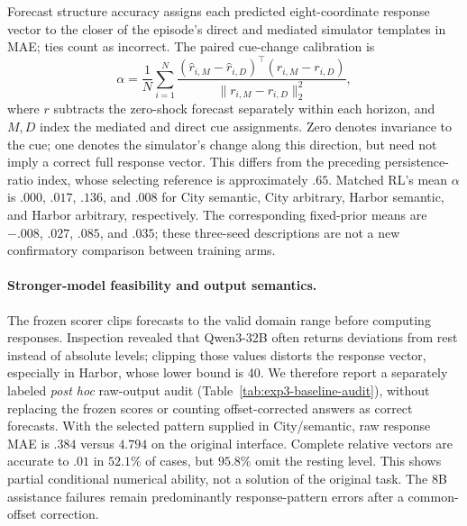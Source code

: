 \begin{table}[htbp]
\centering\small

\caption{\textbf{Reference naming succeeds while forecasting remains difficult.}
Name is selection-only accuracy; Original, Both, and Selected are response MAE
for the three forecast interfaces. Trained rows average all three seeds, not
selected endpoints. Each checkpoint contributes 24 paired episodes per cell.
Domain scales differ, so compare interfaces within a domain.}
\label{tab:exp3-components}
\end{table}

Forecast structure accuracy assigns each predicted eight-coordinate response
vector to the closer of the episode's direct and mediated simulator templates
in MAE; ties count as incorrect. The paired cue-change calibration is
\[
\alpha=\frac{1}{N}\sum_{i=1}^N
\frac{(\widehat r_{i,M}-\widehat r_{i,D})^\top(r_{i,M}-r_{i,D})}
     {\lVert r_{i,M}-r_{i,D}\rVert_2^2},
\]
where $r$ subtracts the zero-shock forecast separately within each horizon,
and $M,D$ index the mediated and direct cue assignments. Zero denotes
invariance to the cue; one denotes the simulator's change along this direction,
but need not imply a correct full response vector. This differs from the
preceding persistence-ratio index, whose selecting reference is approximately
$.65$. Matched RL's mean $\alpha$ is $.000$, $.017$, $.136$, and $.008$ for
City semantic, City arbitrary, Harbor semantic, and Harbor arbitrary,
respectively. The corresponding fixed-prior means are $-.008$, $.027$,
$.085$, and $.035$; these three-seed descriptions are not a new confirmatory
comparison between training arms.

\paragraph{Stronger-model feasibility and output semantics.}
The frozen scorer clips forecasts to the valid domain range before computing
responses. Inspection revealed that Qwen3-32B often returns deviations from rest
instead of absolute levels; clipping those values distorts the response vector,
especially in Harbor, whose lower bound is 40. We therefore report a separately
labeled \emph{post hoc} raw-output audit (Table~\ref{tab:exp3-baseline-audit}),
without replacing the frozen scores or counting offset-corrected answers as
correct forecasts. With the selected pattern supplied in City/semantic, raw
response MAE is $.384$ versus $4.794$ on the original interface. Complete
relative vectors are accurate to $.01$ in $52.1\%$ of cases, but $95.8\%$ omit
the resting level. This shows partial conditional numerical ability, not a
solution of the original task. The 8B assistance failures remain predominantly
response-pattern errors after a common-offset correction.

